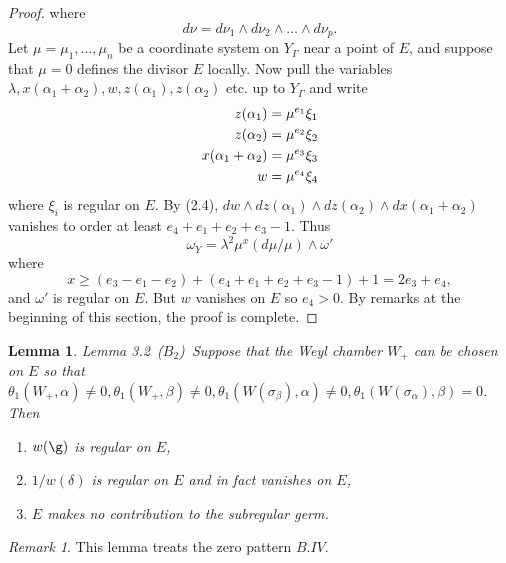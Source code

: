 \documentclass{memo-l}
\newtheorem{lemma}[theorem]{Lemma}
\theoremstyle{definition}
\theoremstyle{remark}
\newtheorem*{remark*}{Remark} %
\numberwithin{section}{chapter}
\numberwithin{equation}{chapter}
\begin{document}
\begin{proof}
\noindent
where
$$
d{\nu} = d{\nu}_{1}\wedge d{\nu}_{2}\wedge \ldots \wedge d{\nu}_{p} .
$$
Let ${\mu} = {\mu}_{1},\ldots , {\mu}_{n}$ be a coordinate system on
$Y_{{\Gamma}}$ near a point of $E$, and suppose that ${\mu} = 0$ defines the
divisor $E$ locally.
 Now pull the variables ${\lambda}, x({\alpha}_{1}+{\alpha}_{2}), w,
z({\alpha}_{1}), z({\alpha}_{2})$ etc.
up to $Y_{{\Gamma}}$ and write
$$
\aligned
z({\alpha}_{1}) &= {\mu}^{e_1} {\xi}_{1}\\
z({\alpha}_{2}) &= {\mu}^{e_2} {\xi}_{2} \\
x({\alpha}_{1}+{\alpha}_{2}) &= {\mu}^{e_3} {\xi}_{3} \\
w &= {\mu}^{e_4} {\xi}_{4}
\endaligned
$$
where ${\xi}_{i}$ is regular on $E$.
 By (2.4), $dw\wedge dz({\alpha}_{1})\wedge dz({\alpha}_{2})\wedge
dx({\alpha}_{1}+{\alpha}_{2})$ vanishes to order at least $e_{4}+e_{1}+
e_{2}+e_{3}-1$.
 Thus
$$
{\omega}_{Y} = {\lambda}^{2}{\mu}^{x}(d{\mu}/{\mu})\wedge {\omega}'
$$
where
$$
x \ge  (e_{3}-e_{1}-e_{2}) + (e_{4}+e_{1}+e_{2}+e_{3}-1) + 1
= 2e_{3}+e_{4} ,
$$
and ${\omega}'$ is regular on $E$.
 But $w$ vanishes on $E$ so $e_{4} > 0$.
 By remarks at the beginning of this section, the proof is complete.
\end{proof}
{\medskip}

\begin{lemma}{Lemma 3.2}\  ($B_{2}$)\ Suppose that the Weyl chamber $W_{+}$ can be
chosen on $E$ so that ${\theta}_{1}(W_{+},{\alpha})\ne 0, {\theta}_{1}(W_{+},
{\beta})\ne 0, {\theta}_{1}(W({\sigma}_{\beta}),{\alpha})\ne 0,
{\theta}_{1}(W({\sigma}_{\alpha}),{\beta}) = 0$.
 Then

\begin{enumerate}[label=\alph*)]
\item $w({\g})$ is regular on $E$,
\item $1/w({\delta})$ is regular on $E$ and in fact vanishes on $E$,
\item $E$ makes no contribution to the subregular germ.
\end{enumerate}
\end{lemma}

\begin{remark*} This lemma treats the zero pattern $B.IV$.
\end{remark*}

\medskip
\end{document}

